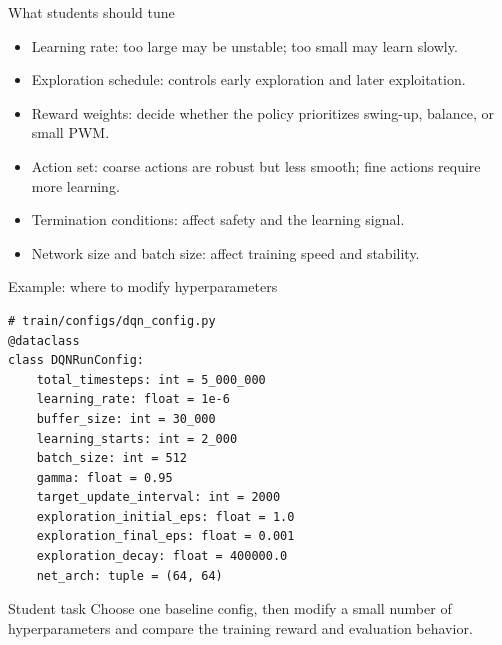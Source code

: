\documentclass[aspectratio=169]{beamer}
\begin{document}
\begin{frame}{What students should tune}
\begin{itemize}
    \item Learning rate: too large may be unstable; too small may learn slowly.
    \vspace{0.2cm}
    \item Exploration schedule: controls early exploration and later exploitation.
    \vspace{0.2cm}
    \item Reward weights: decide whether the policy prioritizes swing-up, balance, or small PWM.
    \vspace{0.2cm}
    \item Action set: coarse actions are robust but less smooth; fine actions require more learning.
    \vspace{0.2cm}
    \item Termination conditions: affect safety and the learning signal.
    \vspace{0.2cm}
    \item Network size and batch size: affect training speed and stability.
\end{itemize}
\end{frame}

\begin{frame}[fragile]{Example: where to modify hyperparameters}
\begin{lstlisting}[basicstyle=\ttfamily\tiny]
# train/configs/dqn_config.py
@dataclass
class DQNRunConfig:
    total_timesteps: int = 5_000_000
    learning_rate: float = 1e-6
    buffer_size: int = 30_000
    learning_starts: int = 2_000
    batch_size: int = 512
    gamma: float = 0.95
    target_update_interval: int = 2000
    exploration_initial_eps: float = 1.0
    exploration_final_eps: float = 0.001
    exploration_decay: float = 400000.0
    net_arch: tuple = (64, 64)
\end{lstlisting}

\vspace{0.1cm}
\begin{block}{Student task}
\small
Choose one baseline config, then modify a small number of hyperparameters and compare the training reward and evaluation behavior.
\end{block}
\end{frame}
\end{document}
